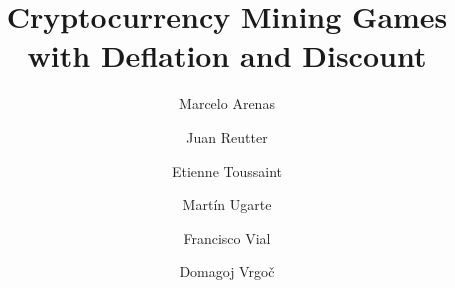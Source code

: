 \documentclass[runningheads]{llncs}
\begin{document}
\title{Cryptocurrency Mining Games with Deflation and Discount}
\author{Marcelo Arenas \and
Juan Reutter \and
Etienne Toussaint \and
Mart\'in Ugarte \and
Francisco Vial \and
Domagoj Vrgo\v{c}\\
\\
\\
\\
}


\maketitle












\newpage

\appendix


\end{document}
